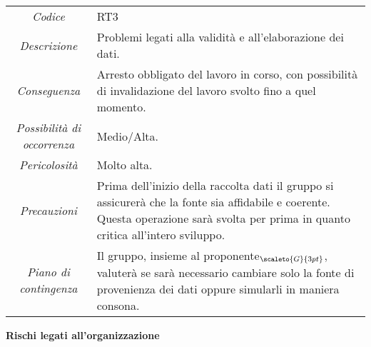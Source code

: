 {{{	\begin{center}
		\renewcommand{\arraystretch}{1.4}
		\begin{tabularx}{\textwidth}{|c|X|}
			\hline
			\rowcolor{airforceblue}
			\multicolumn{2}{|c|}{\textit{Validità dei dati}}\\
			\hline
			\textit{Codice} & RT3 \\
			\hline
			\textit{Descrizione} & Problemi legati alla validità e all'elaborazione dei dati. \\
			\hline
			\textit{Conseguenza} & Arresto obbligato del lavoro in corso, con possibilità di invalidazione del lavoro svolto fino a quel momento. \\
			\hline
			\textit{Possibilità di occorrenza} & Medio/Alta. \\
			\hline
			\textit{Pericolosità} & Molto alta. \\
			\hline
			\textit{Precauzioni} & Prima dell'inizio della raccolta dati il gruppo si assicurerà che la fonte sia affidabile e coerente.
			Questa operazione sarà svolta per prima in quanto critica all'intero sviluppo.  \\
			\hline
			\textit{Piano di contingenza} & Il gruppo, insieme al proponente$_{\scaleto{G}{3pt}}$, valuterà se sarà necessario cambiare solo la fonte di provenienza dei dati oppure simularli in maniera consona. \\
			\hline
		\end{tabularx}
	\end{center}

\quad
\begin{center}
	\LARGE\textbf{Rischi legati all'organizzazione}
\end{center}

\def\tabularxcolumn#1{m{#1}}
{
	
}}}}
